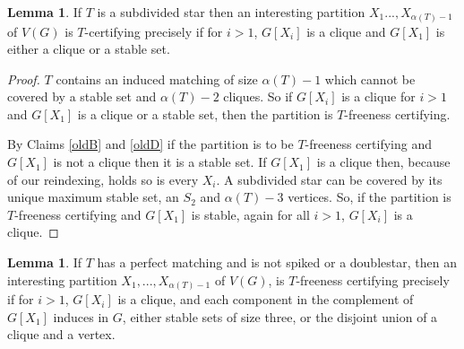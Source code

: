 \documentclass[12pt]{article}
\theoremstyle{definition}
\newtheorem{lemma}[theorem]{Lemma}
\begin{document}
\begin{lemma}\label{ss}
If $T$ is a subdivided star then an interesting  partition $X_1...,X_{\alpha(T)-1}$  of $V(G)$ is $T$-certifying precisely  if for $i>1$, $G[X_i]$ is a clique and 
$G[X_1]$ is either a clique or a stable set.  
\end{lemma}

\begin{proof}
$T$ contains an induced matching of size $\alpha(T)-1$ which cannot be covered by a stable set and $\alpha(T)-2$ cliques. 
So  if $G[X_i]$ is a clique for $i>1$ and $G[X_1]$ is a clique or a stable set,  then the partition is $T$-freeness certifying.

By Claims \ref{oldB} and \ref{oldD} if the partition is to be $T$-freeness certifying and $G[X_1]$ is not a clique  then it is a stable set. 
If $G[X_1]$ is a clique then, because of our reindexing,  holds so is every $X_i$.  A subdivided star can be covered by its unique maximum stable set,
an $S_2$ and $\alpha(T)-3$ vertices. So, if the partition is $T$-freeness certifying and $G[X_1]$ is stable, again for all $i>1$, $G[X_i]$ is a clique. 
\end{proof}


\begin{lemma}\label{nstnds}
 If  $T$ has a perfect matching and   is not  spiked  or a doublestar, then an interesting  partition $X_1,...,X_{\alpha(T)-1}$  of $V(G)$, is $T$-freeness certifying 
precisely if  for $i>1$, $G[X_i]$ is a clique, and each  component in the complement of  $G[X_1]$ induces  in $G$, either stable sets of size three,
or the disjoint union of a clique and a vertex. 
\end{lemma}
\end{document}
